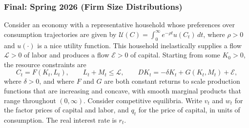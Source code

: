 \documentclass[11pt,english]{article}
\begin{document}
%
%
%



\subsubsection{Final: Spring 2026 (Firm Size Distributions)}
Consider an economy with a representative household whose preferences over
consumption trajectories are given by $\mathcal{U}(C) = \int_0^\infty
e^{-\rho t} u(C_t)\,dt$, where $\rho > 0$ and $u(\cdot)$ is a nice utility
function. This household inelastically supplies a flow $\mathcal{L} > 0$ of
labor and produces a flow $\mathcal{E} > 0$ of capital. Starting from some
$K_0 > 0$, the resource constraints are
\[
    C_t = F(K_t, L_t), \qquad
    L_t + M_t \leq \mathcal{L}, \qquad
    DK_t = -\delta K_t + G(K_t, M_t) + \mathcal{E},
\]
where $\delta > 0$, and where $F$ and $G$ are both constant returns to scale
production functions that are increasing and concave, with smooth marginal
products that range throughout $(0, \infty)$. Consider competitive equilibria.
Write $v_t$ and $w_t$ for the factor prices of capital and labor, and $q_t$
for the price of capital, in units of consumption. The real interest rate is
$r_t$.
 
\end{document}
